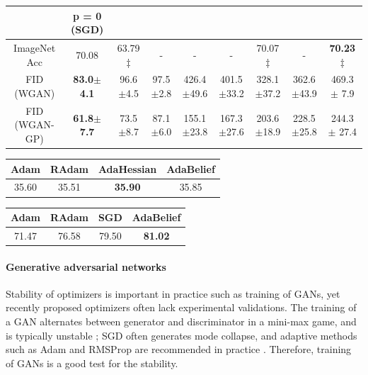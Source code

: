 \documentclass{article}
\begin{document}
\begin{table}[t]
{\begin{tabular}{c|c|ccccccc}
                 & p = 0 (SGD)
                  \\ \hline
ImageNet Acc   & 70.08                      & \multicolumn{1}{c|}{63.79$\ddag$}                         & \multicolumn{1}{c|}{-}                         & \multicolumn{1}{c|}{-}                           & \multicolumn{1}{c|}{-}                           & \multicolumn{1}{c|}{70.07$\ddag$}                       & \multicolumn{1}{c|}{-} & \textbf{70.23} $\ddag$                            \\ \hline
FID (WGAN)    & \textbf{83.0$\pm$ 4.1} & \multicolumn{1}{c|}{96.6$\pm$4.5} & \multicolumn{1}{c|}{97.5$\pm$2.8} & \multicolumn{1}{c|}{426.4$\pm$49.6} & \multicolumn{1}{c|}{401.5$\pm$33.2} & \multicolumn{1}{c|}{328.1$\pm$37.2} & \multicolumn{1}{c|}{362.6$\pm$43.9} & 469.3 $\pm$ 7.9 \\ \hline
FID (WGAN-GP)    & \textbf{61.8$\pm$ 7.7} & \multicolumn{1}{c|}{73.5$\pm$8.7} & \multicolumn{1}{c|}{87.1$\pm$6.0} & \multicolumn{1}{c|}{155.1$\pm$23.8} & \multicolumn{1}{c|}{167.3$\pm$27.6} & \multicolumn{1}{c|}{203.6$\pm$18.9} & \multicolumn{1}{c|}{228.5$\pm$25.8}
& 244.3$\pm$ 27.4\\ \hline
\end{tabular}
}
\begin{minipage}{0.48\textwidth}
\centering
{}
\label{table:transformer}
\begin{tabular}{cccc}
\hline
Adam  & RAdam & AdaHessian & AdaBelief \\ \hline
35.60 & 35.51 & \textbf{35.90} & 35.85     \\ \hline
\end{tabular}
\end{minipage}
\hfill
\begin{minipage}{0.48\textwidth}
\centering
{}
\label{table:object}
\begin{tabular}{cccc}
\hline
Adam  & RAdam & SGD   & AdaBelief \\ \hline
71.47 & 76.58 & 79.50 & \textbf{81.02}     \\ \hline
\end{tabular}
\end{minipage}
\end{table}
\endgroup
\paragraph{Generative adversarial networks} Stability of optimizers is important in practice such as training of GANs, yet recently proposed optimizers often lack experimental validations. The training of a GAN alternates between generator and discriminator in a mini-max game, and is typically unstable \cite{goodfellow2014generative}; SGD often generates mode collapse, and adaptive methods such as Adam and RMSProp are recommended in practice  \cite{goodfellow2016nips, salimans2016improved, gulrajani2017improved}. Therefore, training of GANs is a good test for the stability.
\end{document}
